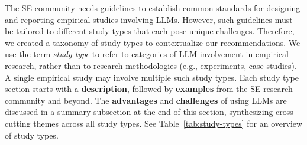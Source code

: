 The SE community needs guidelines to establish common standards for designing and reporting empirical studies involving LLMs.
However, such guidelines must be tailored to different study types that each pose unique challenges.
Therefore, we created a taxonomy of study types to contextualize our recommendations.
We use the term \emph{study type} to refer to categories of LLM involvement in empirical research, rather than to research methodologies (e.g., experiments, case studies). A single empirical study may involve multiple such study types.
Each study type section starts with a \textbf{description}, followed by \textbf{examples} from the SE research community and beyond. The \textbf{advantages} and \textbf{challenges} of using LLMs are discussed in a summary subsection at the end of this section, synthesizing cross-cutting themes across all study types.
\ifpaper
See Table~\ref{tab:study-types} for an overview of study types.
\fi
